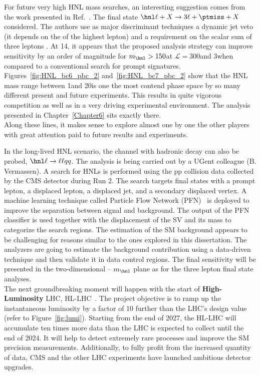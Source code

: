 For future very high HNL mass searches, an interesting suggestion comes from
the work presented in Ref.~\cite{Pascoli_2019}. The
final state $\hnl \ell + X\rightarrow 3\ell + \ptmiss + X$
considered. The
authors use as major
discriminant techniques a dynamic
jet veto (\ie it depends on the \pt of the highest \pt lepton) and a
requirement on the scalar sum of three leptons \pt. At 14\TeV, it appears that
the proposed analysis strategy can
improve sensitivity by an order of
magnitude for $m_\hnl > 150$\GeV at $\mathcal{L} = 300$\fbinv and
3\abinv when compared to a conventional search for prompt signatures. \\

Figures~\ref{fig:HNL_bc6_pbc_2} and~\ref{fig:HNL_bc7_pbc_2} show that
the HNL mass range between 1\GeV and 20\GeV is one the most contend phase
space by so many different present and future experiments. This
results in quite vigorous competition as well as in a very driving
experimental environment. The analysis presented in Chapter~\ref{Chapter6} sits exactly there. \\
Along these lines, it makes sense to explore almost one by one the
other players with great attention paid to future results and experiments.

In the long-lived HNL scenario, the channel with hadronic \PW decay
can also be probed, \ie $\hnl \ell \rightarrow \ell \ell q q $. The analysis is being carried out by a UGent
colleague (B. Vermassen). A search for HNLs is performed using the pp collision
data collected by the CMS detector during Run
2. The search targets final states with a prompt lepton, a displaced lepton, a
displaced jet, and a secondary displaced vertex. A machine learning technique called Particle Flow Network (PFN)~\cite{Komiske_2019} is deployed to
improve the separation between signal and background.
The output of the PFN classifier is used together with the
displacement of the SV and its mass to categorize the search regions.
The estimation of the SM background appears to be challenging for
reasons similar to the ones explored in this dissertation. The
analyzers are going to estimate the background contribution using a data-driven 
technique and then validate it in data control regions. The
final sensitivity will be presented in the two-dimensional \mixpar -- $m_\hnl$
plane as for the three lepton final state analyses.\\

The next groundbreaking moment will happen with the start of
\textbf{High-Luminosity} LHC,
HL-LHC~\cite{ZurbanoFernandez:2020cco}. The project objective is to ramp up the instantaneous luminosity by a factor of 10 further than the LHC’s design value
(refer to Figure~\ref{fig:lumi}).
Starting from the end of 2027, the HL-LHC will accumulate ten times
more data than the LHC is expected to collect until the end of 2024. It will help to
detect extremely rare processes and improve the SM precision
measurements. Additionally, to fully profit from the increased quantity of data, CMS and the other
LHC experiments have launched ambitious detector upgrades.

